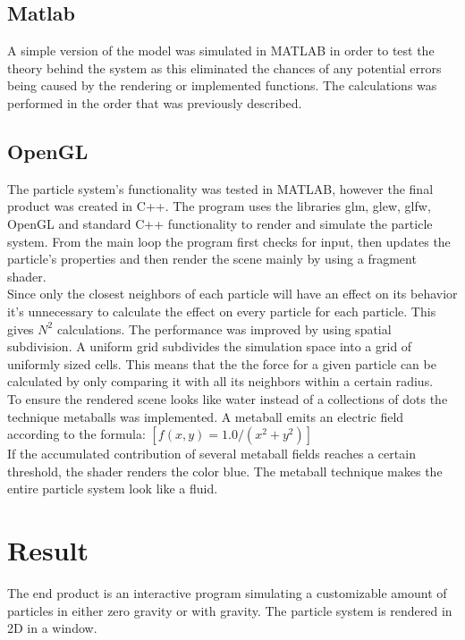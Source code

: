 \documentclass[a4paper,12pt,twoside]{report}
\begin{document}
\section{Matlab}
A simple version of the model was simulated in MATLAB in order to test the theory behind the system as this eliminated the chances of any potential errors being caused by the rendering or implemented functions. The calculations was performed in the order that was previously described.

\section{OpenGL}
The particle system’s functionality was tested in MATLAB, however the final product was created in C++. The program uses the libraries glm, glew, glfw, OpenGL and standard C++ functionality to render and simulate the particle system. From the main loop the program first checks for input, then updates the particle’s properties and then render the scene mainly by using a fragment shader. \\

\noindent Since only the closest neighbors of each particle will have an effect on its behavior it’s unnecessary to calculate the effect on every particle for each particle. This gives $N^2$ calculations. The performance was improved by using spatial subdivision. A uniform grid subdivides the simulation space into a grid of uniformly sized cells. This means that the the force for a given particle can be calculated by only comparing it with all its neighbors within a certain radius. \\

\noindent To ensure the rendered scene looks like water instead of a collections of dots the technique metaballs was implemented. A metaball emits an electric field according to the formula: $[f(x,y) = 1.0 / (x^2 + y^2)]$ \\

\noindent  If the accumulated contribution of several metaball fields reaches a certain threshold, the shader renders the color blue. The metaball technique makes the entire particle system look like a fluid.



\chapter{Result}
The end product is an interactive program simulating a customizable amount of particles in either zero gravity or with gravity. The particle system is rendered in 2D in a window.
\end{document}
